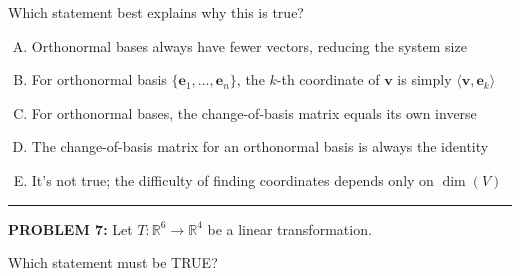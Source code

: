 \documentclass[12pt]{amsart}
\newcommand{\divider}{
  \vspace{-1em} %
  \noindent
  \raisebox{-0.15ex}{\textbullet}%
  \hspace{0.5em}%
  \rule[0.5ex]{0.95\textwidth}{1.0pt}%
  \hspace{0.5em}%
  \raisebox{-0.15ex}{\textbullet}%
  \vspace{0em} %
}
\begin{document}
Which statement best explains why this is true?

\begin{enumerate}[(A)]
\item Orthonormal bases always have fewer vectors, reducing the system size
\item For orthonormal basis $\{\mathbf{e}_1, \ldots, \mathbf{e}_n\}$, the $k$-th coordinate of $\mathbf{v}$ is simply $\langle \mathbf{v}, \mathbf{e}_k \rangle$
\item For orthonormal bases, the change-of-basis matrix equals its own inverse
\item The change-of-basis matrix for an orthonormal basis is always the identity
\item It's not true; the difficulty of finding coordinates depends only on $\dim(V)$
\end{enumerate}


\divider

\newpage

{\bf PROBLEM 7:}
% 
Let $T: \mathbb{R}^6 \to \mathbb{R}^4$ be a linear transformation. 

Which statement must be TRUE?
\end{document}
